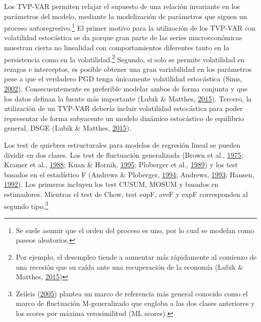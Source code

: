 \documentclass[12pt,oneside]{reedthesis}
\begin{document}
Los TVP-VAR permiten relajar el supuesto de una relación invariante en los parámetros del modelo, mediante la modelización de parámetros que siguen un proceso autoregresivo.\footnote{Se suele asumir que el orden del proceso es uno, por lo cual se modelan como paseos aleatorios.} El primer motivo para la utilización de los TVP-VAR con volatilidad estocástica se da porque gran parte de las series macroeconómicas muestran cierta no linealidad con comportamientos diferentes tanto en la persistencia como en la volatilidad.\footnote{Por ejemplo, el desempleo tiende a aumentar más rápidamente al comienzo de una recesión que su caída ante una recuperación de la economía (Lubik \& Matthes, \protect\hyperlink{ref-Lubik2016b}{2015})} Segundo, si solo se permite volatilidad en rezagos e interceptos, es posible obtener una gran variabilidad en los parámetros pese a que el verdadero PGD tenga únicamente volatilidad estocástica (Sims, \protect\hyperlink{ref-Sims2002}{2002}). Consecuentemente es preferible modelar ambos de forma conjunta y que los datos definan la fuente más importante (Lubik \& Matthes, \protect\hyperlink{ref-Lubik2016b}{2015}). Tercero, la utilización de un TVP-VAR debería incluir volatilidad estocástica para poder representar de forma subyacente un modelo dinámico estocástico de equilibrio general, DSGE (Lubik \& Matthes, \protect\hyperlink{ref-Lubik2016b}{2015}).

Los test de quiebres estructurales para modelos de regresión lineal se pueden dividir en dos clases. Los test de fluctuación generalizada (Brown et al., \protect\hyperlink{ref-Brown1975}{1975}; Kramer et al., \protect\hyperlink{ref-Society1988}{1988}; Kuan \& Hornik, \protect\hyperlink{ref-Kuan1995}{1995}; Ploberger et al., \protect\hyperlink{ref-Ploberger1989}{1989}) y los test basados en el estadístico F (Andrews \& Ploberger, \protect\hyperlink{ref-Andrews1994}{1994}; Andrews, \protect\hyperlink{ref-Andrews1993}{1993}; Hansen, \protect\hyperlink{ref-Hansen1992}{1992}). Los primeros incluyen los test CUSUM, MOSUM y basados en estimadores. Mientras el test de Chow, test supF, aveF y expF corresponden al segundo tipo.\footnote{Zeileis (\protect\hyperlink{ref-Zeileis2005}{2005}) plantea un marco de referencia más general conocido como el marco de fluctuación M-generalizado que engloba a las dos clases anteriores y los scores por máxima verosimilitud (ML scores).}
\end{document}
